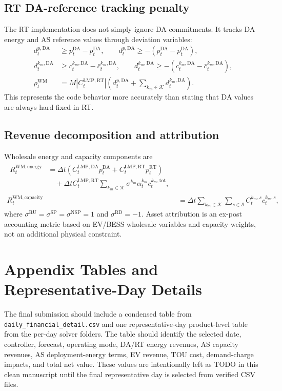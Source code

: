 \documentclass[final,5p,times]{elsarticle}
\newcommand{\DeltaT}{\Delta t}
\newcommand{\DA}{\mathrm{DA}}
\newcommand{\RT}{\mathrm{RT}}
\newcommand{\RU}{\mathrm{RU}}
\newcommand{\RD}{\mathrm{RD}}
\newcommand{\SP}{\mathrm{SP}}
\newcommand{\NSP}{\mathrm{NSP}}
\newcommand{\WM}{\mathrm{WM}}
\newcommand{\tot}{\mathrm{tot}}
\newcommand{\energy}{\mathrm{energy}}
\newcommand{\capacity}{\mathrm{capacity}}
\newcommand{\calK}{\mathcal{K}}
\newcommand{\calS}{\mathcal{S}}
\begin{document}
\subsection{RT DA-reference tracking penalty}
The RT implementation does not simply ignore DA commitments. It tracks DA energy and AS reference values through deviation variables:
\begin{align}
d_t^{p,\DA}&\ge p_t^{\DA}-\bar p_t^{\DA},\qquad d_t^{p,\DA}\ge -(p_t^{\DA}-\bar p_t^{\DA}),\label{eq:app_da_dev_p}\\
d_t^{k_m,\DA}&\ge c_t^{k_m,\DA}-\bar c_t^{k_m,\DA},\qquad d_t^{k_m,\DA}\ge -(c_t^{k_m,\DA}-\bar c_t^{k_m,\DA}),\label{eq:app_da_dev_c}\\
\rho_t^{\WM}&=M\left|C_t^{\mathrm{LMP},\RT}\right|\left(d_t^{p,\DA}+\sum_{k_m\in\calK}d_t^{k_m,\DA}\right).\label{eq:app_rt_penalty}
\end{align}
This represents the code behavior more accurately than stating that DA values are always hard fixed in RT.

\subsection{Revenue decomposition and attribution}
Wholesale energy and capacity components are
\begin{align}
\begin{split}
R_t^{\WM,\energy} &= \DeltaT\left(C_t^{\mathrm{LMP},\DA}p_t^{\DA}
+C_t^{\mathrm{LMP},\RT}p_t^{\RT}\right)\\
&\quad +\DeltaT C_t^{\mathrm{LMP},\RT}\sum_{k_m\in\calK}\sigma^{k_m}\alpha_t^{k_m}c_t^{k_m,\tot},
\end{split}\label{eq:app_rev_energy}\\
R_t^{\WM,\capacity} &= \DeltaT\sum_{k_m\in\calK}\sum_{s\in\calS}C_t^{k_m,s}c_t^{k_m,s},\label{eq:app_rev_capacity}
\end{align}
where $\sigma^{\RU}=\sigma^{\SP}=\sigma^{\NSP}=1$ and $\sigma^{\RD}=-1$. Asset attribution is an ex-post accounting metric based on EV/BESS wholesale variables and capacity weights, not an additional physical constraint.

\section{Appendix Tables and Representative-Day Details}
\label{app:result_tables}

The final submission should include a condensed table from \texttt{daily\_financial\_detail.csv} and one representative-day product-level table from the per-day solver folders. The table should identify the selected date, controller, forecast, operating mode, DA/RT energy revenues, AS capacity revenues, AS deployment-energy terms, EV revenue, TOU cost, demand-charge impacts, and total net value. These values are intentionally left as TODO in this clean manuscript until the final representative day is selected from verified CSV files.



\end{document}
